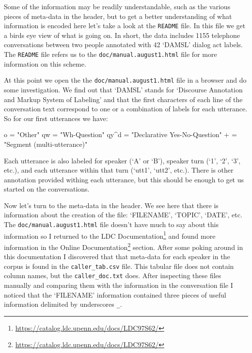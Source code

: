 \documentclass[
  letterpaper,
  DIV=11,
  numbers=noendperiod]{scrreport}
\newenvironment{Shaded}{\begin{snugshade}}{\end{snugshade}}
\newcommand{\NormalTok}[1]{\textcolor[rgb]{0.00,0.00,0.00}{#1}}
\theoremstyle{definition}
\theoremstyle{remark}
\DeclareRobustCommand{\href}[2]{#2\footnote{\url{#1}}}
\begin{document}
Some of the information may be readily understandable, such as the
various pieces of meta-data in the header, but to get a better
understanding of what information is encoded here let's take a look at
the \texttt{README} file. In this file we get a birds eye view of what
is going on. In short, the data includes 1155 telephone conversations
between two people annotated with 42 `DAMSL' dialog act labels. The
\texttt{README} file refers us to the \texttt{doc/manual.august1.html}
file for more information on this scheme.

At this point we open the the \texttt{doc/manual.august1.html} file in a
browser and do some investigation. We find out that `DAMSL' stands for
`Discourse Annotation and Markup System of Labeling' and that the first
characters of each line of the conversation text correspond to one or a
combination of labels for each utterance. So for our first utterances we
have:

\begin{Shaded}
\begin{Highlighting}[]
\NormalTok{o = "Other"}
\NormalTok{qw = "Wh{-}Question"}
\NormalTok{qy\^{}d = "Declarative Yes{-}No{-}Question"}
\NormalTok{+ = "Segment (multi{-}utterance)"}
\end{Highlighting}
\end{Shaded}

Each utterance is also labeled for speaker (`A' or `B'), speaker turn
(`1', `2', `3', etc.), and each utterance within that turn (`utt1',
`utt2', etc.). There is other annotation provided withing each
utterance, but this should be enough to get us started on the
conversations.

Now let's turn to the meta-data in the header. We see here that there is
information about the creation of the file: `FILENAME', `TOPIC', `DATE',
etc. The \texttt{doc/manual.august1.html} file doesn't have much to say
about this information so I returned to the
\href{https://catalog.ldc.upenn.edu/docs/LDC97S62/}{LDC Documentation}
and found more information in the
\href{https://catalog.ldc.upenn.edu/docs/LDC97S62/}{Online
Documentation} section. After some poking around in this documentation I
discovered that that meta-data for each speaker in the corpus is found
in the \texttt{caller\_tab.csv} file. This tabular file does not contain
column names, but the \texttt{caller\_doc.txt} does. After inspecting
these files manually and comparing them with the information in the
conversation file I noticed that the `FILENAME' information contained
three pieces of useful information delimited by underscores \texttt{\_}.
\end{document}
